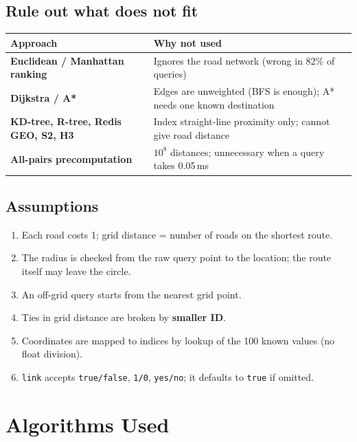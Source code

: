 \documentclass[11pt,a4paper]{article}
\newcommand{\code}[1]{\texttt{#1}}
\newcommand{\thead}{\rowcolor{accentlight}}
\begin{document}
\subsection{Rule out what does not fit}
\begin{center}\begin{minipage}{\textwidth}
\begin{tabularx}{\textwidth}{@{}>{\bfseries}lX@{}}
\toprule
\thead \normalfont\sffamily\bfseries Approach & \sffamily\bfseries Why not used \\
\midrule
Euclidean / Manhattan ranking & Ignores the road network (wrong in 82\% of queries) \\
Dijkstra / A* & Edges are unweighted (BFS is enough); A* needs one known destination \\
KD-tree, R-tree, Redis GEO, S2, H3 & Index straight-line proximity only; cannot give road distance \\
All-pairs precomputation & $10^8$ distances; unnecessary when a query takes 0.05\,ms \\
\bottomrule
\end{tabularx}
\end{minipage}\end{center}

\subsection{Assumptions}
\begin{enumerate}[label=\textbf{\color{accent}A\arabic*}, leftmargin=2.2em]
  \item Each road costs 1; grid distance = number of roads on the shortest route.
  \item The radius is checked from the raw query point to the location; the route itself may leave the circle.
  \item An off-grid query starts from the nearest grid point.
  \item Ties in grid distance are broken by \textbf{smaller ID}.
  \item Coordinates are mapped to indices by lookup of the 100 known values (no float division).
  \item \code{link} accepts \code{true/false}, \code{1/0}, \code{yes/no}; it defaults to \code{true} if omitted.
\end{enumerate}

\section{Algorithms Used}
\end{document}
